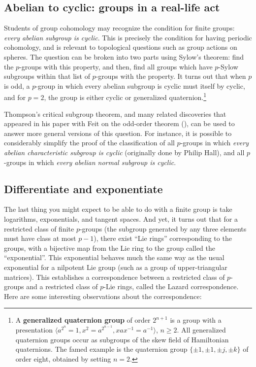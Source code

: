 \documentclass{amsart}
\renewcommand{\definedind}[1]{{\bf #1}}
\begin{document}
\subsection{Abelian to cyclic: groups in a real-life act}

Students of group cohomology may recognize the condition for finite
groups: {\em every abelian subgroup is cyclic}. This is precisely the
condition for having periodic cohomology, and is relevant to
topological questions such as group actions on spheres. The question
can be broken into two parts using Sylow's theorem: find the
$p$-groups with this property, and then, find all groups which have
$p$-Sylow subgroups within that list of $p$-groups with the
property. It turns out that when $p$ is odd, a $p$-group in which
every abelian subgroup is cyclic must itself by cyclic, and for $p =
2$, the group is either cyclic or generalized quaternion.\footnote{A
  \definedind{generalized quaternion group} of order $2^{n+1}$ is a group with a
  presentation $\langle a^{2^n} = 1, x^2 = a^{2^{n-1}}, xax^{-1} =
  a^{-1} \rangle$, $n \ge 2$. All generalized quaternion groups occur
  as subgroups of the skew field of Hamiltonian quaternions. The famed
  example is the quaternion group $\{ \pm 1, \pm 1, \pm j, \pm k \}$
  of order eight, obtained by setting $n = 2$.}

Thompson's critical subgroup theorem, and many related discoveries
that appeared in his paper with Feit on the odd-order theorem
(\cite{feitthompson}), can be used to answer more general versions of
this question. For instance, it is possible to considerably simplify
the proof of the classification of all $p$-groups in which {\em every
  abelian characteristic subgroup is cyclic} (originally done by
Philip Hall), and all $p$-groups in which {\em every abelian normal subgroup
  is cyclic}.

\subsection{Differentiate and exponentiate}

The last thing you might expect to be able to do with a finite group
is take logarithms, exponentials, and tangent spaces. And yet, it
turns out that for a restricted class of finite $p$-groups (the
subgroup generated by any three elements must have class at most
$p-1$), there exist ``Lie rings'' corresponding to the groups, with a
bijective map from the Lie ring to the group called the
``exponential''. This exponential behaves much the same way as the
usual exponential for a nilpotent Lie group (such as a group of
upper-triangular matrices). This establishes a correspondence between
a restricted class of $p$-groups and a restricted class of $p$-Lie
rings, called the Lazard correspondence.  Here are some interesting
observations about the correspondence:
\end{document}
